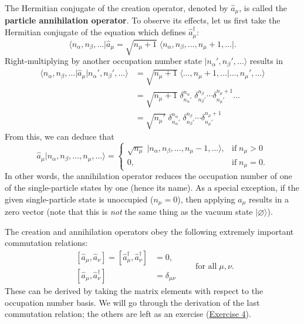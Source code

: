 \documentclass[pra,12pt]{revtex4}
\begin{document}
The Hermitian conjugate of the creation operator, denoted by $\hat{a}_\mu$,
is called the \textbf{particle annihilation operator}.  To observe its
effects, let us first take the Hermitian conjugate of the equation
which defines $\hat{a}_\mu^\dagger$:
$$\big\langle n_\alpha, n_\beta, \dots\big| \hat{a}_\mu = \sqrt{n_\mu+1} \; \big\langle n_\alpha, n_\beta, \dots, n_\mu + 1, \dots\big|. $$
Right-multiplying by another occupation number state
$|n_\alpha',n_\beta',\dots\rangle$ results in
$$\begin{aligned}\big\langle n_\alpha, n_\beta, \dots \big| \hat{a}_\mu \big|n_\alpha',n_\beta',\dots\big\rangle &= \sqrt{n_\mu+1} \; \big\langle \dots, n_\mu + 1, \dots\big| \dots, n_\mu',\dots\big\rangle \\&= \sqrt{n_\mu+1}\; \delta^{n_\alpha}_{n_\alpha'}\; \delta^{n_\beta}_{n_\beta'} \cdots \delta^{n_\mu+1}_{n_\mu'} \dots \\  &= \sqrt{n_\mu'}\; \delta^{n_\alpha}_{n_\alpha'}\; \delta^{n_\beta}_{n_\beta'} \cdots \delta^{n_\mu+1}_{n_\mu'}\end{aligned}$$
From this, we can deduce that
$$\hat{a}_\mu \big|n_\alpha, n_\beta, \dots, n_\mu, \dots\big\rangle = \begin{cases} \sqrt{n_\mu} \; \big|n_\alpha, n_\beta, \dots, n_\mu - 1, \dots\big\rangle, & \mathrm{if}\; n_\mu > 0 \\ 0, & \mathrm{if}\; n_\mu = 0.\end{cases} $$
In other words, the annihilation operator reduces the occupation
number of one of the single-particle states by one (hence its name).
As a special exception, if the given single-particle state is
unoccupied ($n_\mu = 0$), then applying $\hat{a}_\mu$ results in a zero
vector (note that this is \textit{not} the same thing as the vacuum
state $|\varnothing\rangle$).

The creation and annihilation operators obey the following extremely
important commutation relations:
$$\begin{aligned}\,[\hat{a}_\mu,\hat{a}_\nu] = [\hat{a}_\mu^\dagger,\hat{a}_\nu^\dagger] &= 0, \\ \,[\hat{a}_\mu,\hat{a}_\nu^\dagger] &= \delta_{\mu\nu}\end{aligned}\qquad\textrm{for all}\;\mu,\nu.$$
These can be derived by taking the matrix elements with respect to the
occupation number basis.  We will go through the derivation of the
last commutation relation; the others are left as an exercise
(\hyperref[ex:boson_commutators]{Exercise 4}).
\end{document}
